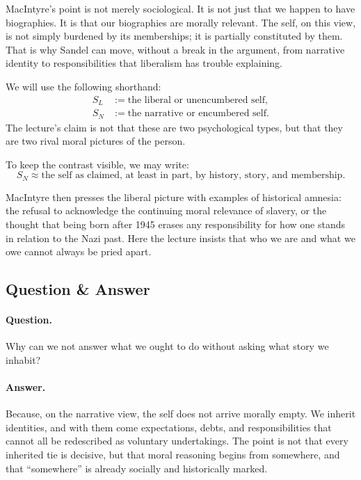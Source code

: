 MacIntyre's point is not merely sociological. It is not just that we happen to have biographies. It is that our biographies are morally relevant. The self, on this view, is not simply burdened by its memberships; it is partially constituted by them. That is why Sandel can move, without a break in the argument, from narrative identity to responsibilities that liberalism has trouble explaining.

\begin{definition}
We will use the following shorthand:
\begin{align}
S_L &:= \text{the liberal or unencumbered self}, \\
S_N &:= \text{the narrative or encumbered self}.
\end{align}
The lecture's claim is not that these are two psychological types, but that they are two rival moral pictures of the person.
\end{definition}

To keep the contrast visible, we may write:
\begin{equation}
S_N \approx \text{the self as claimed, at least in part, by history, story, and membership.}
\end{equation}

MacIntyre then presses the liberal picture with examples of historical amnesia: the refusal to acknowledge the continuing moral relevance of slavery, or the thought that being born after 1945 erases any responsibility for how one stands in relation to the Nazi past. Here the lecture insists that who we are and what we owe cannot always be pried apart.

\subsection{Question \& Answer}

\paragraph{Question.} Why can we not answer what we ought to do without asking what story we inhabit?

\paragraph{Answer.} Because, on the narrative view, the self does not arrive morally empty. We inherit identities, and with them come expectations, debts, and responsibilities that cannot all be redescribed as voluntary undertakings. The point is not that every inherited tie is decisive, but that moral reasoning begins from somewhere, and that ``somewhere'' is already socially and historically marked.

